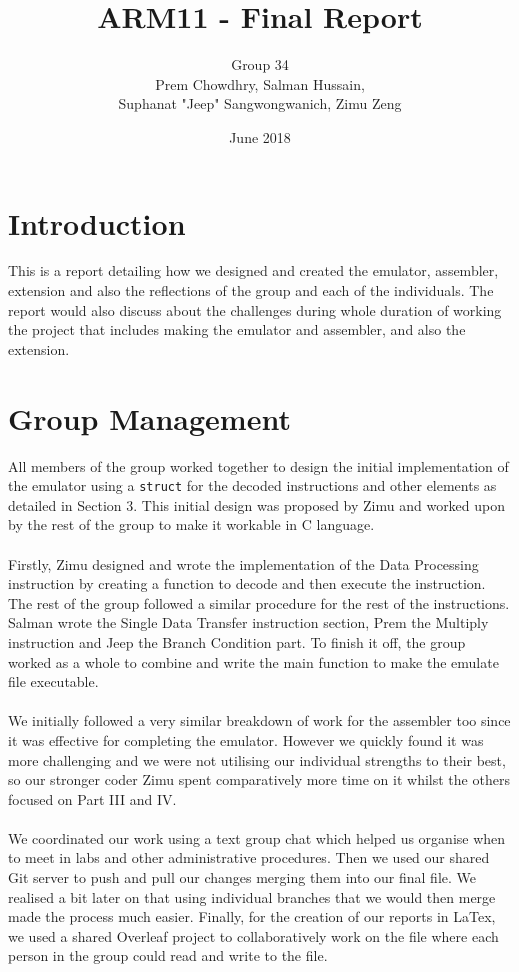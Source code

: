 \documentclass[11pt,twoside]{article}
\begin{document}
\title{\bf \Huge ARM11 - Final Report}
\author{Group 34\\ Prem Chowdhry, Salman Hussain, \\  Suphanat "Jeep" Sangwongwanich, Zimu Zeng}
\date{June 2018}
\maketitle

\section{Introduction}
This is a report detailing how we designed and created the emulator, assembler, extension and also the reflections of the group and each of the individuals. The report would also discuss about the challenges during whole duration of working the project that includes making the emulator and assembler, and also the extension. \\

\section{Group Management}
All members of the group worked together to design the initial implementation of the emulator using a \texttt{struct} for the decoded instructions and other elements as detailed in Section 3. This initial design was proposed by Zimu and worked upon by the rest of the group to make it workable in C language.\\\\
Firstly, Zimu designed and wrote the implementation of the Data Processing instruction by creating a function to decode and then execute the instruction. The rest of the group followed a similar procedure for the rest of the instructions. Salman wrote the Single Data Transfer instruction section, Prem the Multiply instruction and Jeep the Branch Condition part. To finish it off, the group worked as a whole to combine and write the main function to make the emulate file executable.\\\\
We initially followed a very similar breakdown of work for the assembler too since it was effective for completing the emulator. However we quickly found it was more challenging and we were not utilising our individual strengths to their best, so our stronger coder Zimu spent comparatively more time on it whilst the others focused on Part III and IV. \\\\
We coordinated our work using a text group chat which helped us organise when to meet in labs and other administrative procedures. Then we used our shared Git server to push and pull our changes merging them into our final file. We realised a bit later on that using individual branches that we would then merge made the process much easier. Finally, for the creation of our reports in LaTex, we used a shared Overleaf project to collaboratively work on the file where each person in the group could read and write to the file. \\
\end{document}
